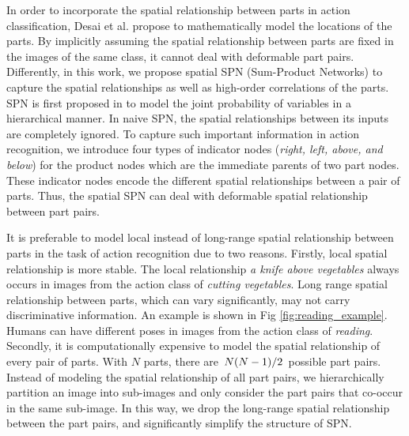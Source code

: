 \documentclass[journal]{IEEEtran}
\begin{document}

In order to incorporate the spatial relationship between parts in action classification, Desai et al. \cite{desai10_action} propose to mathematically model the locations of the parts. By implicitly assuming the spatial relationship between parts are fixed in the images of the same class, it cannot deal with deformable part pairs.
Differently, in this work, we propose spatial SPN (Sum-Product Networks) to capture the spatial relationships as well as high-order correlations of the parts.
SPN is first proposed in \cite{poon2011SPNIntroduce} to model the joint probability of variables in a hierarchical manner. In naive SPN, the spatial relationships between its inputs are completely ignored. To capture such important information in action recognition, we introduce four types of indicator nodes (\textit{right, left, above, and below}) for the product nodes which are the immediate parents of two part nodes. These indicator nodes encode the different spatial relationships between a pair of parts. Thus, the spatial SPN can deal with deformable spatial relationship between part pairs.





\newcommand{\slfrac}[2]{\left.#1\middle/#2\right.}

It is preferable to model local instead of long-range spatial relationship between parts in the task of action recognition due to two reasons. 
Firstly, local spatial relationship is more stable. The local relationship \textit{a knife above vegetables} always occurs in images from the action class of \textit{cutting vegetables}. Long range spatial relationship between parts, which can vary significantly, may not carry discriminative information. An example is shown in Fig \ref{fig:reading_example}. Humans can have different poses in images from the action class of \textit{reading}. 
Secondly, it is computationally expensive to model the spatial relationship of every pair of parts.
With $ N $ parts, there are $\slfrac{N(N-1)}{2} $ possible part pairs. Instead of modeling the spatial relationship of all part pairs, we hierarchically partition an image into sub-images and only consider the part pairs that co-occur in the same sub-image. In this way, we drop the long-range spatial relationship between the part pairs, and significantly simplify the structure of SPN.
 
\end{document}
